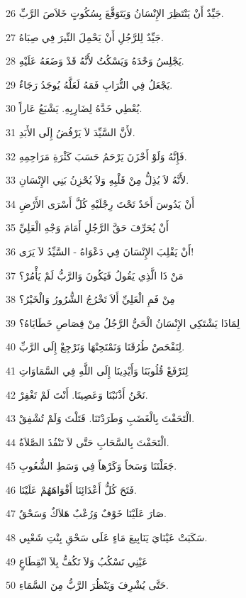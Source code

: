\par 26 جَيِّدٌ أَنْ يَنْتَظِرَ الإِنْسَانُ وَيَتَوَقَّعَ بِسُكُوتٍ خَلاَصَ الرَّبِّ.
\par 27 جَيِّدٌ لِلرَّجُلِ أَنْ يَحْمِلَ النِّيرَ فِي صِبَاهُ.
\par 28 يَجْلِسُ وَحْدَهُ وَيَسْكُتُ لأَنَّهُ قَدْ وَضَعَهُ عَلَيْهِ.
\par 29 يَجْعَلُ فِي التُّرَابِ فَمَهُ لَعَلَّهُ يُوجَدُ رَجَاءٌ.
\par 30 يُعْطِي خَدَّهُ لِضَارِبِهِ. يَشْبَعُ عَاراً.
\par 31 لأَنَّ السَّيِّدَ لاَ يَرْفُضُ إِلَى الأَبَدِ.
\par 32 فَإِنَّهُ وَلَوْ أَحْزَنَ يَرْحَمُ حَسَبَ كَثْرَةِ مَرَاحِمِهِ.
\par 33 لأَنَّهُ لاَ يُذِلُّ مِنْ قَلْبِهِ وَلاَ يُحْزِنُ بَنِي الإِنْسَانِ.
\par 34 أَنْ يَدُوسَ أَحَدٌ تَحْتَ رِجْلَيْهِ كُلَّ أَسْرَى الأَرْضِ
\par 35 أَنْ يُحَرِّفَ حَقَّ الرَّجُلِ أَمَامَ وَجْهِ الْعَلِيِّ
\par 36 أَنْ يَقْلِبَ الإِنْسَانَ فِي دَعْوَاهُ - السَّيِّدُ لاَ يَرَى!
\par 37 مَنْ ذَا الَّذِي يَقُولُ فَيَكُونَ وَالرَّبُّ لَمْ يَأْمُرْ؟
\par 38 مِنْ فَمِ الْعَلِيِّ أَلاَ تَخْرُجُ الشُّرُورُ وَالْخَيْرُ؟
\par 39 لِمَاذَا يَشْتَكِي الإِنْسَانُ الْحَيُّ الرَّجُلُ مِنْ قِصَاصِ خَطَايَاهُ؟
\par 40 لِنَفْحَصْ طُرُقَنَا وَنَمْتَحِنْهَا وَنَرْجِعْ إِلَى الرَّبِّ.
\par 41 لِنَرْفَعْ قُلُوبَنَا وَأَيْدِينَا إِلَى اللَّهِ فِي السَّمَاوَاتِ
\par 42 نَحْنُ أَذْنَبْنَا وَعَصِينَا. أَنْتَ لَمْ تَغْفِرْ.
\par 43 الْتَحَفْتَ بِالْغَضَبِ وَطَرَدْتَنَا. قَتَلْتَ وَلَمْ تُشْفِقْ.
\par 44 الْتَحَفْتَ بِالسَّحَابِ حَتَّى لاَ تَنْفُذَ الصَّلاَةُ.
\par 45 جَعَلْتَنَا وَسَخاً وَكَرْهاً فِي وَسَطِ الشُّعُوبِ.
\par 46 فَتَحَ كُلُّ أَعْدَائِنَا أَفْوَاهَهُمْ عَلَيْنَا.
\par 47 صَارَ عَلَيْنَا خَوْفٌ وَرُعْبٌ هَلاَكٌ وَسَحْقٌ.
\par 48 سَكَبَتْ عَيْنَايَ يَنَابِيعَ مَاءٍ عَلَى سَحْقِ بِنْتِ شَعْبِي.
\par 49 عَيْنِي تَسْكُبُ وَلاَ تَكُفُّ بِلاَ انْقِطَاعٍ
\par 50 حَتَّى يُشْرِفَ وَيَنْظُرَ الرَّبُّ مِنَ السَّمَاءِ.
